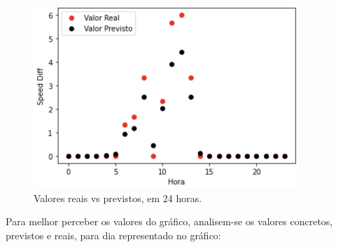 \documentclass[a4paper, 12pt]{article}
\begin{document}
\begin{figure}[H]
	\centering
	\includegraphics[width=10cm]{resultados/prev_real_no_inc.png}
	\caption{Valores reais vs previstos, em 24 horas.}
\end{figure}

Para melhor perceber os valores do gráfico, analisem-se os valores concretos, previstos e reais, para dia representado no gráfico:
\end{document}
